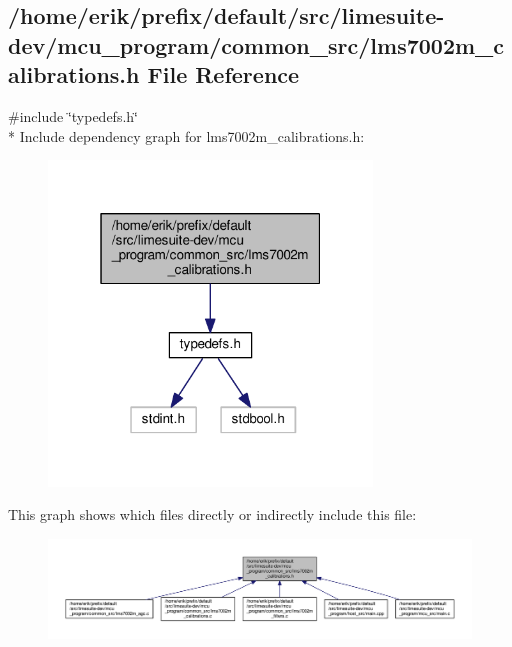 \subsection{/home/erik/prefix/default/src/limesuite-\/dev/mcu\+\_\+program/common\+\_\+src/lms7002m\+\_\+calibrations.h File Reference}
\label{lms7002m__calibrations_8h}
{\ttfamily \#include \char`\"{}typedefs.\+h\char`\"{}}\\*
Include dependency graph for lms7002m\+\_\+calibrations.\+h\+:
\nopagebreak
\begin{figure}[H]
\begin{center}
\leavevmode
\includegraphics[width=244pt]{df/d04/lms7002m__calibrations_8h__incl}
\end{center}
\end{figure}
This graph shows which files directly or indirectly include this file\+:
\nopagebreak
\begin{figure}[H]
\begin{center}
\leavevmode
\includegraphics[width=350pt]{dd/d7f/lms7002m__calibrations_8h__dep__incl}
\end{center}
\end{figure}
